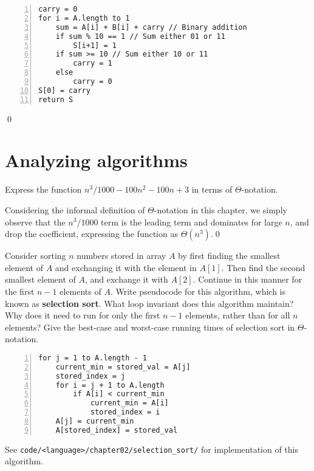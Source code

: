\begin{Verbatim}[frame=single,numbers=left,samepage=true,label={ADD(A,B)}]
carry = 0
for i = A.length to 1
    sum = A[i] + B[i] + carry // Binary addition
    if sum % 10 == 1 // Sum either 01 or 11
        S[i+1] = 1
    if sum >= 10 // Sum either 10 or 11
        carry = 1
    else
        carry = 0
S[0] = carry
return S
\end{Verbatim}
\qed


\section{Analyzing algorithms}
 Express the function $n^3 / 1000 - 100n^2 - 100n + 3$ in terms of $\Theta$-notation.

\sol Considering the informal definition of $\Theta$-notation in this chapter, we simply observe that  the $n^3 / 1000$ term is the leading term and dominates for large $n$, and drop the coefficient, expressing the function as $\Theta(n^3)$.\qed

 Consider sorting $n$ numbers stored in array $A$ by first finding the smallest element of $A$ and exchanging it with the element in $A[1]$. Then find the second smallest element of $A$, and exchange it with $A[2]$. Continue in this manner for the first $n-1$ elements of $A$. Write pseudocode for this algorithm, which is known as \textbf{selection sort}. What loop invariant does this algorithm maintain? Why does it need to run for only the first $n-1$ elements, rather than for all $n$ elements? Give the best-case and worst-case running times of selection sort in $\Theta$-notation.

\sol
\begin{Verbatim}[frame=single,numbers=left,samepage=true,label={SELECTION-SORT(A)}]
for j = 1 to A.length - 1
    current_min = stored_val = A[j]
    stored_index = j
    for i = j + 1 to A.length
        if A[i] < current_min
            current_min = A[i]
            stored_index = i
    A[j] = current_min
    A[stored_index] = stored_val
\end{Verbatim}

See \verb|code/<language>/chapter02/selection_sort/| for implementation of this algorithm.

